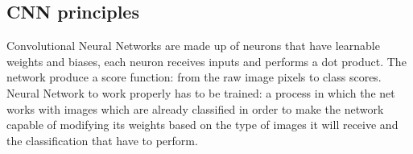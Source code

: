 \documentclass[../main.tex]{subfiles}
\begin{document}
\subsection{CNN principles}
Convolutional Neural Networks are made up of neurons that have learnable weights and biases, each neuron receives inputs and performs a dot product. The network produce a score function: from the raw image pixels to class scores. 
Neural Network to work properly has to be trained: a process in which the net works with images which are already classified in order to make the network capable of modifying its weights based on the type of images it will receive and the classification that have to perform.
\vspace{5mm}
\end{document}

